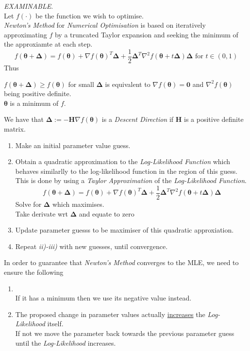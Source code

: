 \documentclass[11pt,a4paper]{article}
\begin{document}
\textit{EXAMINABLE}.\\
Let $f(\cdot)$ be the function we wish to optimise.\\
\textit{Newton's Method} for \textit{Numerical Optimisation} is based on iteratively approximating $f$ by a truncated Taylor expansion and seeking the minimum of the approxiamte at each step.
$$f(\pmb\theta+\pmb\Delta)=f(\pmb\theta)+\nabla f(\pmb\theta)^T\pmb\Delta+\frac12\pmb\Delta^T\nabla^2 f(\pmb\theta+t\pmb\Delta)\pmb\Delta\text{ for }t\in(0,1)$$
Thus
\begin{center}$f(\pmb\theta+\pmb\Delta)\geq f(\pmb\theta)$ for small $\pmb\Delta$ is equivalent to $\nabla f(\pmb\theta)=\pmb0$ and $\nabla^2 f(\pmb\theta)$ being positive definite.\\
\ie $\pmb\theta$ is a minimum of $f$.\end{center}
We have that $\pmb\Delta:=-\textbf{H}\nabla f(\pmb\theta)$ is a \textit{Descent Direction} if $\textbf{H}$ is a positive definite matrix.\\ %

\begin{enumerate}
	\item Make an initial parameter value guess.
	\item Obtain a quadratic approximation to the \textit{Log-Likelihood Function} which behaves similarlly to the log-likelihood function in the region of this guess.\\
	\nb This is done by using a \textit{Taylor Approximation} of the \textit{Log-Likelihood Function}.
	$$f(\pmb\theta+\pmb\Delta)=f(\pmb\theta)+\nabla f(\pmb\theta)^T\pmb\Delta+\frac12\pmb\Delta^T\nabla^2f(\pmb\theta+t\pmb\Delta)\pmb\Delta$$
	Solve for $\pmb\Delta$ which maximises.\\
	\nb Take derivate wrt $\pmb\Delta$ and equate to zero %
	\item Update parameter guesss to be maximiser of this quadratic approxiation.
	\item Repeat \textit{ii)-iii)} with new guesses, until convergence.
\end{enumerate}

In order to guarantee that \textit{Newton's Method} converges to the MLE, we need to ensure the following
\begin{enumerate}
	\item {}\\
	\nb If it has a minimum then we use its negative value instead.
	\item The proposed change in parameter values actually \underline{increases} the \textit{Log-Likelihood} itself.\\
	If not we move the parameter back towards the previous parameter guess until the \textit{Log-Likelihood} increases.
\end{enumerate}
\end{document}
